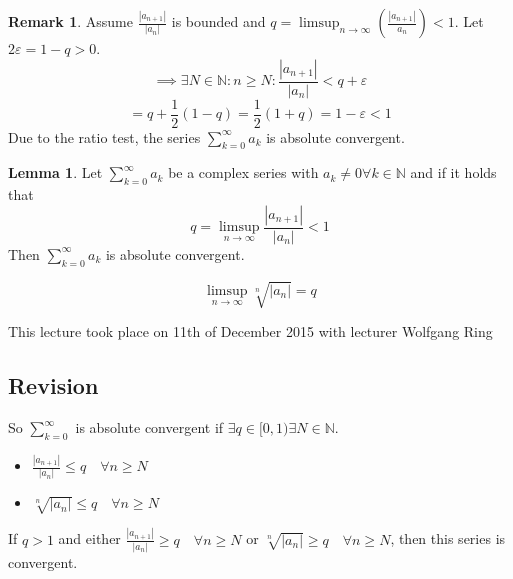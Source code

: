 \documentclass[a4paper,landscape,twocolumn]{article}
\theoremstyle{definition}
\newtheorem{rem}{Remark}
\newtheorem{lemma}{Lemma}
\newcommand\abs[1]{\left|#1\right|}
\newcommand\meta[3]{\begin{mdframed}[skipbelow=4pt,skipabove=4pt,innermargin=1pt,innerleftmargin=1pt,innerrightmargin=1pt]\begin{center}\small{\textdownarrow{} This #1 took place on #2 with lecturer #3}\end{center}\end{mdframed}}
\begin{document}
\begin{rem}
  Assume $\frac{\abs{a_{n+1}}}{\abs{a_n}}$ is bounded and $q = \limsup_{n\to\infty}\left(\frac{\abs{a_{n+1}}}{a_n}\right) < 1$.
  Let $2 \varepsilon = 1 - q > 0$.
  \[ \implies \exists N \in \mathbb N: n \geq N: \frac{\abs{a_{n+1}}}{\abs{a_n}} < q + \varepsilon \]
  \[ = q + \frac12 \left(1 - q\right) = \frac12 (1 + q) = 1 - \varepsilon < 1 \]
  Due to the ratio test, the series $\sum_{k=0}^\infty a_k$ is absolute convergent.
\end{rem}

\begin{lemma}
  Let $\sum_{k=0}^\infty a_k$ be a complex series with $a_k \neq 0 \forall k \in \mathbb N$
  and if it holds that
  \[ q = \limsup_{n\to\infty} \frac{\abs{a_{n+1}}}{\abs{a_n}} < 1 \]
  Then $\sum_{k=0}^\infty a_k$ is absolute convergent.

  \[ \limsup_{n\to\infty} \sqrt[n]{\abs{a_n}} = q \]
\end{lemma}

\meta{lecture}{11th of December 2015}{Wolfgang Ring}

\subsection{Revision}
%
So $\sum_{k=0}^\infty$ is absolute convergent if $\exists q \in [0,1) \exists N \in \mathbb N$.

\begin{itemize}
  \item $\frac{\abs{a_{n+1}}}{\abs{a_n}} \leq q \quad\forall n \geq N$
  \item $\sqrt[n]{\abs{a_n}} \leq q \quad \forall n \geq N$
\end{itemize}

If $q > 1$ and either $\frac{\abs{a_{n+1}}}{\abs{a_n}} \geq q \quad \forall n \geq N$
or $\sqrt[n]{\abs{a_n}} \geq q \quad\forall n \geq N$, then this series is convergent.
\end{document}
